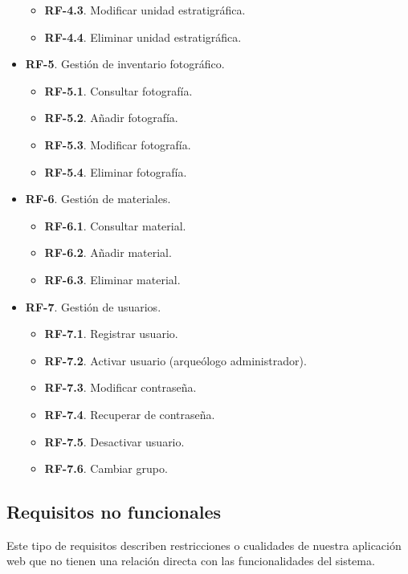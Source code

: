 \begin{itemize}
\begin{itemize}
                \item \textbf{RF-4.3}. Modificar unidad estratigráfica.
                \item \textbf{RF-4.4}. Eliminar unidad estratigráfica.          
            \end{itemize}
        \item \textbf{RF-5}. Gestión de inventario fotográfico.
            \begin{itemize}
                \item \textbf{RF-5.1}. Consultar fotografía.
                \item \textbf{RF-5.2}. Añadir fotografía.
                \item \textbf{RF-5.3}. Modificar fotografía.
                \item \textbf{RF-5.4}. Eliminar fotografía.    
            \end{itemize}
        \item \textbf{RF-6}. Gestión de materiales.
            \begin{itemize}
                \item \textbf{RF-6.1}. Consultar material.
                \item \textbf{RF-6.2}. Añadir material.
                \item \textbf{RF-6.3}. Eliminar material.    
            \end{itemize}
        \item \textbf{RF-7}. Gestión de usuarios.
            \begin{itemize}
                \item \textbf{RF-7.1}. Registrar usuario.
                \item \textbf{RF-7.2}. Activar usuario (arqueólogo administrador).
                \item \textbf{RF-7.3}. Modificar contraseña.
                \item \textbf{RF-7.4}. Recuperar de contraseña.
                \item \textbf{RF-7.5}. Desactivar usuario.
                \item \textbf{RF-7.6}. Cambiar grupo.
            \end{itemize}
    \end{itemize}

\subsection{Requisitos no funcionales}
Este tipo de requisitos describen restricciones o cualidades de nuestra aplicación web que
no tienen una relación directa con las funcionalidades del sistema.

